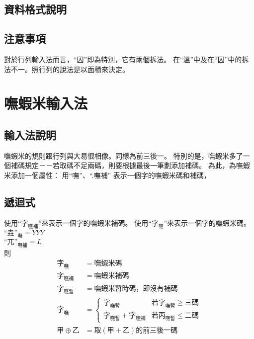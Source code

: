 \documentclass{article}
\begin{document}
\subsection{資料格式說明}
\subsection{注意事項}
對於行列輸入法而言，``囚''即為特別，它有兩個拆法。
在``溫''中及在``囚''中的拆法不一。照行列的說法是以面積來決定。

\section{嘸蝦米輸入法}
\subsection{輸入法說明}
嘸蝦米的規則跟行列與大易很相像。同樣為前三後一。
特別的是，嘸蝦米多了一個補碼規定－－若取碼不足兩碼，則要根據最後一筆劃添加補碼。
為此，為嘸蝦米添加一個屬性：
用``嘸''、``.嘸補'' 表示一個字的嘸蝦米碼和補碼，\\
\subsection{遞迴式}
使用``$\mbox{字}_{\mbox{嘸補}}$''來表示一個字的嘸蝦米補碼。
使用``$\mbox{字}_{\mbox{嘸}}$''來表示一個字的嘸蝦米碼。
$\mbox{``垚''}_{\mbox{嘸}}=YYY$\\
$\mbox{``兀''}_{\mbox{嘸補}}=L$\\
則
\begin{subequations}
  \begin{align}
  \mbox{字}_{\mbox{嘸}} &= 嘸蝦米碼\\
  \mbox{字}_{\mbox{嘸補}} &= 嘸蝦米補碼\\
  \mbox{字}_{\mbox{嘸暫}} &= 嘸蝦米暫時碼，即沒有補碼\\
  \mbox{字}_{\mbox{嘸}} &=
      \left\{\begin{array}{ll}
        \mbox{字}_{\mbox{嘸暫}}
           & \mbox{若$\mbox{字}_{\mbox{嘸暫}} \geq $三碼}\\
        \mbox{字}_{\mbox{嘸暫}}+\mbox{字}_{\mbox{嘸補}}
           & \mbox{若$\mbox{丙}_{\mbox{嘸暫}} \leq $二碼}
      \end{array}\right.\\
  甲 \oplus 乙 &= 取(甲+乙)的前三後一碼\\
  \end{align}
\end{subequations}
\end{document}
